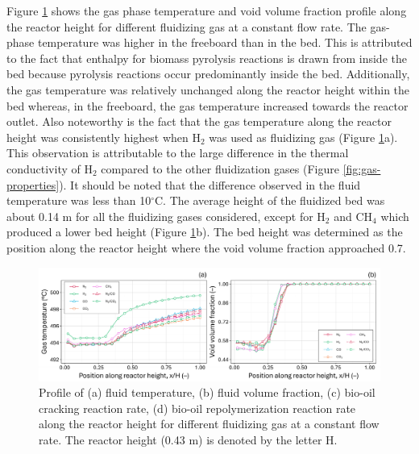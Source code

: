 Figure \ref{fig:cfd-temp-void-biooil} shows the gas phase temperature and void volume fraction profile along the reactor height for different fluidizing gas at a constant flow rate. The gas-phase temperature was higher in the freeboard than in the bed. This is attributed to the fact that enthalpy for biomass pyrolysis reactions is drawn from inside the bed because pyrolysis reactions occur predominantly inside the bed. Additionally, the gas temperature was relatively unchanged along the reactor height within the bed whereas, in the freeboard, the gas temperature increased towards the reactor outlet. Also noteworthy is the fact that the gas temperature along the reactor height was consistently highest when H$_2$ was used as fluidizing gas (Figure \ref{fig:cfd-temp-void-biooil}a). This observation is attributable to the large difference in the thermal conductivity of H$_2$ compared to the other fluidization gases (Figure \ref{fig:gas-properties}). It should be noted that the difference observed in the fluid temperature was less than 10$^{\circ}$C. The average height of the fluidized bed was about 0.14 m for all the fluidizing gases considered, except for H$_2$ and CH$_4$ which produced a lower bed height (Figure \ref{fig:cfd-temp-void-biooil}b). The bed height was determined as the position along the reactor height where the void volume fraction approached 0.7.

\begin{figure}[H]
    \centering
    \includegraphics[width=1.0\textwidth]{figures/cfd-temp-void-biooil.pdf}
    \caption{Profile of (a) fluid temperature, (b) fluid volume fraction, (c) bio-oil cracking reaction rate, (d) bio-oil repolymerization reaction rate along the reactor height for different fluidizing gas at a constant flow rate. The reactor height (0.43 m) is denoted by the letter H.}
    \label{fig:cfd-temp-void-biooil}
\end{figure}

